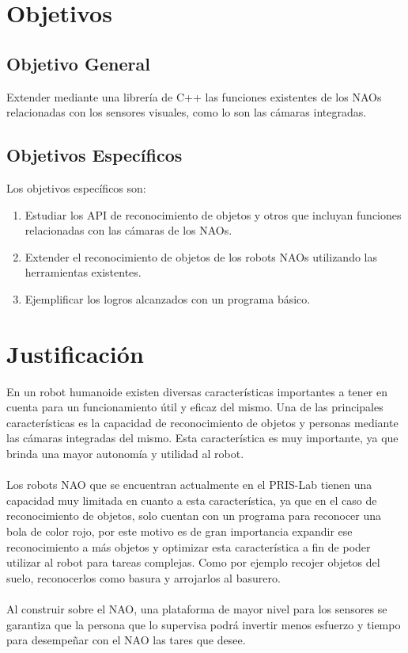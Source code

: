 \documentclass[letterpaper]{article}
\begin{document}
\section{Objetivos}
\subsection{Objetivo General}
Extender mediante una librería de C++ las funciones existentes de los NAOs relacionadas con los sensores visuales, como lo son las cámaras integradas.
\subsection{Objetivos Específicos}

Los objetivos específicos son:\\

\begin{enumerate}
\item Estudiar los API de reconocimiento de objetos y otros que incluyan funciones relacionadas con las cámaras de los NAOs.
\item Extender el reconocimiento de objetos de los robots NAOs utilizando las herramientas existentes.
\item Ejemplificar los logros alcanzados con un programa básico.
\end{enumerate}

\section{Justificación}
En un robot humanoide existen diversas características importantes a tener en cuenta para un funcionamiento útil y eficaz del mismo. Una de las principales características es la capacidad de reconocimiento de objetos y personas mediante las cámaras integradas del mismo. Esta característica es muy importante, ya que brinda una mayor autonomía y utilidad al robot.\\\\
Los robots NAO que se encuentran actualmente en el PRIS-Lab tienen una capacidad muy limitada en cuanto a esta característica, ya que en el caso de reconocimiento de objetos, solo cuentan con un programa para reconocer una bola de color rojo, por este motivo es de gran importancia expandir ese reconocimiento a más objetos y optimizar esta característica a fin de poder utilizar al robot para tareas complejas. Como por ejemplo recojer objetos del suelo, reconocerlos como basura y arrojarlos al basurero.\\\\
Al construir sobre el NAO, una plataforma de mayor nivel para los sensores se garantiza que la persona que lo supervisa podrá invertir menos esfuerzo y tiempo para desempeñar con el NAO las tares que desee.\\\\
\end{document}
